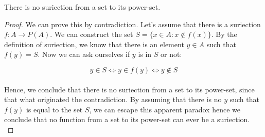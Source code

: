 \begin{theorem}
    There is no suriection from a set to its power-set.
\end{theorem}
\begin{proof}
    We can prove this by contradiction. Let's assume that there is a suriection $f : A \rightarrow P(A)$.
    We can construct the set $S = \{ x \in A : x \notin f(x) \}$. By the definition of suriection, we know that 
    there is an element $y \in A$ such that $f(y) = S$. Now we can ask ourselves if $y$ is in $S$ or not:

    $$  y \in S \iff y \in f(y) \iff y \notin S  $$ \\

    Hence, we conclude that there is no suriection from a set to its power-set, since 
    that what originated the contradiction. By assuming that there is no $y$ such that $f(y)$ is 
    equal to the set $S$, we can escape this apparent paradox hence we conclude that no function 
    from a set to its power-set can ever be a suriection. \\
\end{proof}

